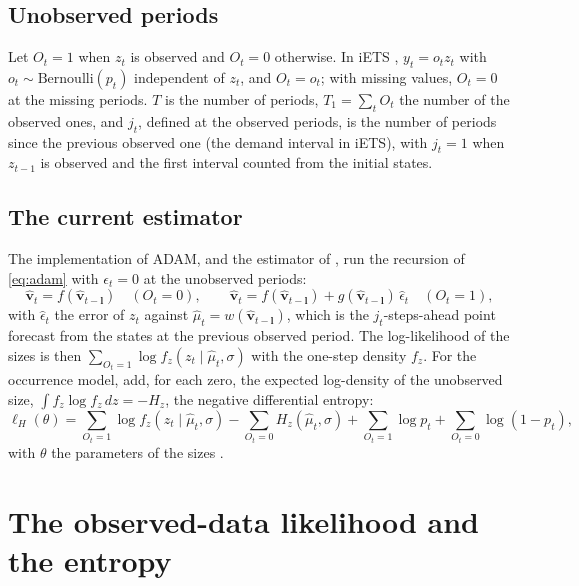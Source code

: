 \documentclass[11pt,a4paper]{article}
\newcommand{\vect}[1]{\mathbf{#1}}
\theoremstyle{remark}
\begin{document}
\subsection{Unobserved periods}

Let $O_t = 1$ when $z_t$ is observed and $O_t = 0$ otherwise. In iETS \citep{iETS},
$y_t = o_t z_t$ with $o_t \sim \text{Bernoulli}(p_t)$ independent of $z_t$, and $O_t = o_t$; with
missing values, $O_t = 0$ at the missing periods. $T$ is the number of periods, $T_1 = \sum_t O_t$
the number of the observed ones, and $j_t$, defined at the observed periods, is the number of
periods since the previous observed one (the demand interval in iETS), with $j_t = 1$ when $z_{t-1}$
is observed and the first interval counted from the initial states.

\subsection{The current estimator}

The implementation of ADAM, and the estimator of \citet[Appendix~C]{iETS}, run the recursion of
\eqref{eq:adam} with $\epsilon_t = 0$ at the unobserved periods:
\begin{equation}
\hat{\vect v}_t = f(\hat{\vect v}_{t-\vect l}) \quad (O_t = 0), \qquad
\hat{\vect v}_t = f(\hat{\vect v}_{t-\vect l}) + g(\hat{\vect v}_{t-\vect l})\,\hat\epsilon_t
\quad (O_t = 1),
\label{eq:recursion}
\end{equation}
with $\hat\epsilon_t$ the error of $z_t$ against $\hat\mu_t = w(\hat{\vect v}_{t-\vect l})$, which is
the $j_t$-steps-ahead point forecast from the states at the previous observed period. The
log-likelihood of the sizes is then $\sum_{O_t=1}\log f_z(z_t\mid\hat\mu_t,\sigma)$ with the
one-step density $f_z$. For the occurrence model, \citet{iETS} add, for each zero, the expected
log-density of the unobserved size, $\int f_z\log f_z\,dz = -H_z$, the negative differential entropy:
\begin{equation}
\ell_H(\theta) = \sum_{O_t=1}\log f_z(z_t\mid\hat\mu_t,\sigma) - \sum_{O_t=0}H_z(\hat\mu_t,\sigma)
+ \sum_{O_t=1}\log p_t + \sum_{O_t=0}\log(1-p_t),
\label{eq:entropy}
\end{equation}
with $\theta$ the parameters of the sizes \citep[eq.~B.6]{iETS}.

\section{The observed-data likelihood and the entropy}
\label{sec:entropy}
\end{document}
